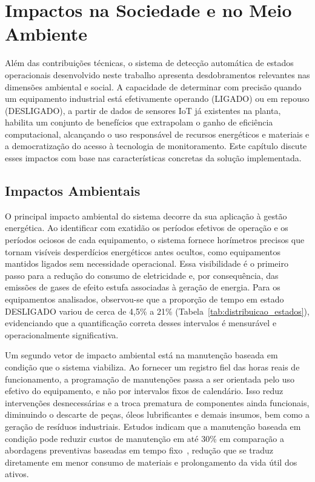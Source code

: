 \newpage
\chapter{Impactos na Sociedade e no Meio Ambiente}
\label{chap:impacto_socioambiental}

Além das contribuições técnicas, o sistema de detecção automática de estados operacionais desenvolvido neste trabalho apresenta desdobramentos relevantes nas dimensões ambiental e social. A capacidade de determinar com precisão quando um equipamento industrial está efetivamente operando (LIGADO) ou em repouso (DESLIGADO), a partir de dados de sensores IoT já existentes na planta, habilita um conjunto de benefícios que extrapolam o ganho de eficiência computacional, alcançando o uso responsável de recursos energéticos e materiais e a democratização do acesso à tecnologia de monitoramento. Este capítulo discute esses impactos com base nas características concretas da solução implementada.

\section{Impactos Ambientais}

O principal impacto ambiental do sistema decorre da sua aplicação à gestão energética. Ao identificar com exatidão os períodos efetivos de operação e os períodos ociosos de cada equipamento, o sistema fornece horímetros precisos que tornam visíveis desperdícios energéticos antes ocultos, como equipamentos mantidos ligados sem necessidade operacional. Essa visibilidade é o primeiro passo para a redução do consumo de eletricidade e, por consequência, das emissões de gases de efeito estufa associadas à geração de energia. Para os equipamentos analisados, observou-se que a proporção de tempo em estado DESLIGADO variou de cerca de 4,5\% a 21\% (Tabela~\ref{tab:distribuicao_estados}), evidenciando que a quantificação correta desses intervalos é mensurável e operacionalmente significativa.

Um segundo vetor de impacto ambiental está na manutenção baseada em condição que o sistema viabiliza. Ao fornecer um registro fiel das horas reais de funcionamento, a programação de manutenções passa a ser orientada pelo uso efetivo do equipamento, e não por intervalos fixos de calendário. Isso reduz intervenções desnecessárias e a troca prematura de componentes ainda funcionais, diminuindo o descarte de peças, óleos lubrificantes e demais insumos, bem como a geração de resíduos industriais. Estudos indicam que a manutenção baseada em condição pode reduzir custos de manutenção em até 30\% em comparação a abordagens preventivas baseadas em tempo fixo~\cite{jardine2006review}, redução que se traduz diretamente em menor consumo de materiais e prolongamento da vida útil dos ativos.

